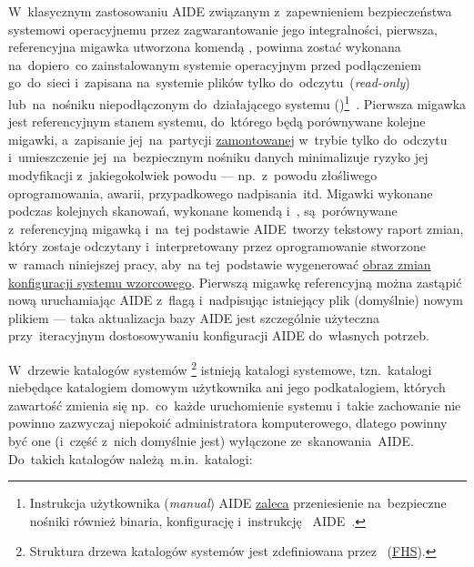 \documentclass[thesis]{subfiles}
\begin{document}
W~klasycznym zastosowaniu AIDE związanym z~zapewnieniem bezpieczeństwa systemowi operacyjnemu przez zagwarantowanie jego integralności, pierwsza, referencyjna migawka utworzona komendą , powinna zostać wykonana na~dopiero~co zainstalowanym systemie operacyjnym przed podłączeniem go~do~sieci i~zapisana na~systemie plików tylko do~odczytu~(\emph{read-only}) lub~na~nośniku niepodłączonym do~działającego systemu ()\footnote{Instrukcja użytkownika (\emph{\gls{manual}}) AIDE \href{http://aide.sourceforge.net/stable/manual.html\#usage}{zaleca} przeniesienie na~bezpieczne nośniki również binaria, konfigurację i~instrukcję ~AIDE~\cite{aide-manual}.}~\cite{aide-manual}. Pierwsza migawka jest referencyjnym stanem systemu, do~którego będą porównywane kolejne migawki, a~zapisanie jej~na~partycji \href{https://linux.die.net/man/8/mount}{zamontowanej} w~trybie tylko do~odczytu i~umieszczenie jej~na~bezpiecznym nośniku danych minimalizuje ryzyko jej modyfikacji z~jakiegokolwiek powodu --- np.~z~powodu złośliwego oprogramowania, awarii, przypadkowego nadpisania~itd. Migawki wykonane podczas kolejnych skanowań, wykonane komendą  i~, są~porównywane z~referencyjną migawką i~na~tej podstawie AIDE~tworzy tekstowy raport zmian, który zostaje odczytany i~interpretowany przez oprogramowanie stworzone w~ramach niniejszej pracy, aby~na tej~podstawie wygenerować \hyperref[sec:obraz-zmian-konfiguracji]{obraz zmian konfiguracji systemu wzorcowego}. Pierwszą migawkę referencyjną można zastąpić nową uruchamiając AIDE z~flagą  i~nadpisując istniejący plik (domyślnie)  nowym plikiem  --- taka aktualizacja bazy AIDE jest szczególnie użyteczna przy~iteracyjnym dostosowywaniu konfiguracji AIDE  do~własnych potrzeb.

W~drzewie katalogów systemów \footnote{Struktura drzewa katalogów systemów  jest zdefiniowana przez ~(\href{http://www.tldp.org/LDP/sag/html/fs-background.html}{FHS}).} istnieją katalogi systemowe, tzn.~katalogi niebędące katalogiem domowym użytkownika ani jego podkatalogiem, których zawartość zmienia się np.~co~każde uruchomienie systemu i~takie zachowanie nie powinno zazwyczaj niepokoić administratora komputerowego, dlatego powinny być one (i~część z~nich domyślnie jest) wyłączone ze~skanowania~AIDE. Do~takich katalogów należą~m.in.~katalogi:\mynobreakpar
\end{document}
